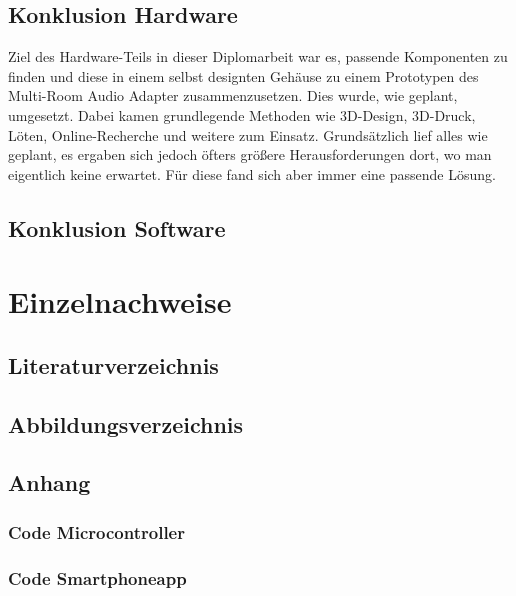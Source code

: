 \documentclass[11pt, twoside]{article}
\begin{document}
\subsection{Konklusion Hardware}
Ziel des Hardware-Teils in dieser Diplomarbeit war es, passende Komponenten zu finden und diese in einem selbst designten Gehäuse zu einem Prototypen des Multi-Room Audio Adapter zusammenzusetzen. Dies wurde, wie geplant, umgesetzt. Dabei kamen grundlegende Methoden wie 3D-Design, 3D-Druck, Löten, Online-Recherche und weitere zum Einsatz. Grundsätzlich lief alles wie geplant, es ergaben sich jedoch öfters größere Herausforderungen dort, wo man eigentlich keine erwartet. Für diese fand sich aber immer eine passende Lösung.
\subsection{Konklusion Software}
\section{Einzelnachweise}
\subsection{Literaturverzeichnis}
\printbibliography
\subsection{Abbildungsverzeichnis}
\listoffigures
\subsection{Anhang}
\subsubsection{Code Microcontroller}
\subsubsection{Code Smartphoneapp}
\end{document}
